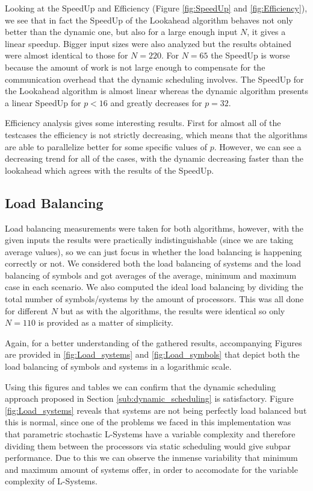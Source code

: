 \documentclass[letterpaper,twoside,11pt]{article}
\begin{document}
\begin{multicols}{2}
Looking at the SpeedUp and Efficiency (Figure \ref{fig:SpeedUp} and \ref{fig:Efficiency}), we see that in fact the SpeedUp of the Lookahead algorithm behaves not only better than the dynamic one, but also for a large enough input $N$, it gives a linear speedup. Bigger input sizes were also analyzed but the results obtained were almost identical to those for $N = 220$. For $N=65$ the SpeedUp is worse because the amount of work is not large enough to compensate for the communication overhead that the dynamic scheduling involves. The SpeedUp for the Lookahead algorithm is almost linear whereas the dynamic algorithm presents a linear SpeedUp for $p < 16$ and greatly decreases for $p = 32$.

Efficiency analysis gives some interesting results. First for almost all of the testcases the efficiency is not strictly decreasing, which means that the algorithms are able to parallelize better for some specific values of $p$. However, we can see a decreasing trend for all of the cases, with the dynamic decreasing faster than the lookahead which agrees with the results of the SpeedUp.


\subsection{Load Balancing} %
\label{sub:load_balancing}

Load balancing measurements were taken for both algorithms, however, with the given inputs the results were practically indistinguishable (since we are taking average values), so we can just focus in whether the load balancing is happening correctly or not. We considered both the load balancing of systems and the load balancing of symbols and got averages of the average, minimum and maximum case in each scenario. We also computed the ideal load balancing by dividing the total number of symbols/systems by the amount of processors. This was all done for different $N$ but as with the algorithms, the results were identical so only $N = 110$ is provided as a matter of simplicity.

Again, for a better understanding of the gathered results, accompanying Figures are provided in \ref{fig:Load_systems} and \ref{fig:Load_symbols} that depict both the load balancing of symbols and systems in a logarithmic scale.

Using this figures and tables we can confirm that the dynamic scheduling approach proposed in Section \ref{sub:dynamic_scheduling} is satisfactory. Figure \ref{fig:Load_systems} reveals that systems are not being perfectly load balanced but this is normal, since one of the problems we faced in this implementation was that parametric stochastic L-Systems have a variable complexity and therefore dividing them between the processors via static scheduling would give subpar performance. Due to this we can observe the inmense variability that minimum and maximum amount of systems offer, in order to accomodate for the variable complexity of L-Systems.


\end{multicols}
\end{document}

